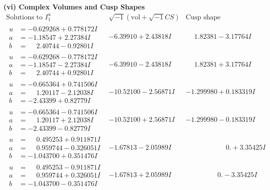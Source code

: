 \documentclass[1p]{elsarticle_modified}
\theoremstyle{definition}
\newcommand{\I}{\sqrt{-1}}
\begin{document}
\newpage\flushleft \textbf{(vi) Complex Volumes and Cusp Shapes}
$$\begin{array}{c|c|c}  
\text{Solutions to }I^u_{1}& \I (\text{vol} + \sqrt{-1}CS) & \text{Cusp shape}\\
 \hline 
\begin{aligned}
u &= -0.629268 + 0.778172 I \\
a &= -1.18547 + 2.27384 I \\
b &= \phantom{-}2.40744 - 0.92801 I\end{aligned}
 & -6.39910 + 2.43818 I & \phantom{-}1.82381 - 3.17764 I \\ \hline\begin{aligned}
u &= -0.629268 - 0.778172 I \\
a &= -1.18547 - 2.27384 I \\
b &= \phantom{-}2.40744 + 0.92801 I\end{aligned}
 & -6.39910 - 2.43818 I & \phantom{-}1.82381 + 3.17764 I \\ \hline\begin{aligned}
u &= -0.665364 + 0.741506 I \\
a &= \phantom{-}1.20117 - 2.12038 I \\
b &= -2.43399 + 0.82779 I\end{aligned}
 & -10.52100 - 2.56871 I & -1.299980 + 0.183319 I \\ \hline\begin{aligned}
u &= -0.665364 - 0.741506 I \\
a &= \phantom{-}1.20117 + 2.12038 I \\
b &= -2.43399 - 0.82779 I\end{aligned}
 & -10.52100 + 2.56871 I & -1.299980 - 0.183319 I \\ \hline\begin{aligned}
u &= \phantom{-}0.495253 + 0.911871 I \\
a &= \phantom{-}0.959744 - 0.326051 I \\
b &= -1.043700 + 0.351476 I\end{aligned}
 & -1.67813 - 2.05989 I & \phantom{-0.000000 -}0. + 3.35425 I \\ \hline\begin{aligned}
u &= \phantom{-}0.495253 - 0.911871 I \\
a &= \phantom{-}0.959744 + 0.326051 I \\
b &= -1.043700 - 0.351476 I\end{aligned}
 & -1.67813 + 2.05989 I & \phantom{-0.000000 } 0. - 3.35425 I \\ \hline\begin{aligned}

\end{aligned}
\end{array}$$
\end{document}
